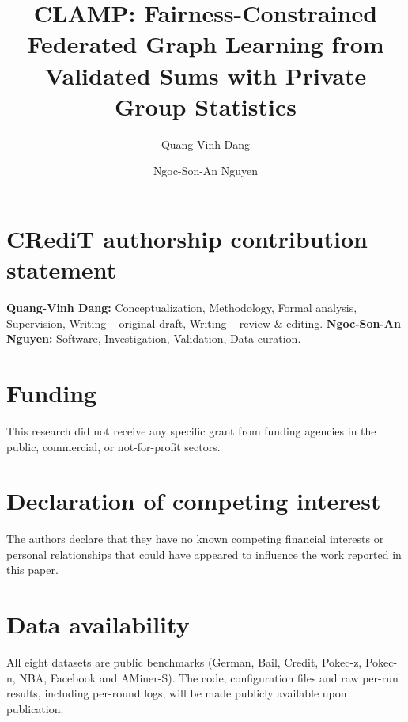 \documentclass[preprint,12pt]{elsarticle}
\theoremstyle{plain}
\theoremstyle{definition}
\theoremstyle{remark}
\begin{document}
\begin{frontmatter}

\title{CLAMP: Fairness-Constrained Federated Graph Learning from Validated Sums with Private Group Statistics}

\author[inst1]{Quang-Vinh Dang}

\author[inst2]{Ngoc-Son-An Nguyen}





\end{frontmatter}











\section*{CRediT authorship contribution statement}
\textbf{Quang-Vinh Dang:} Conceptualization, Methodology, Formal analysis, Supervision, Writing -- original draft, Writing -- review \& editing.
\textbf{Ngoc-Son-An Nguyen:} Software, Investigation, Validation, Data curation.

\section*{Funding}
This research did not receive any specific grant from funding agencies in the public, commercial, or not-for-profit sectors.

\section*{Declaration of competing interest}
The authors declare that they have no known competing financial interests or personal relationships that could have appeared to influence the work reported in this paper.

\section*{Data availability}
All eight datasets are public benchmarks (German, Bail, Credit, Pokec-z, Pokec-n, NBA, Facebook and AMiner-S). The code, configuration files and raw per-run results, including per-round logs, will be made publicly available upon publication.

\appendix




\end{document}
